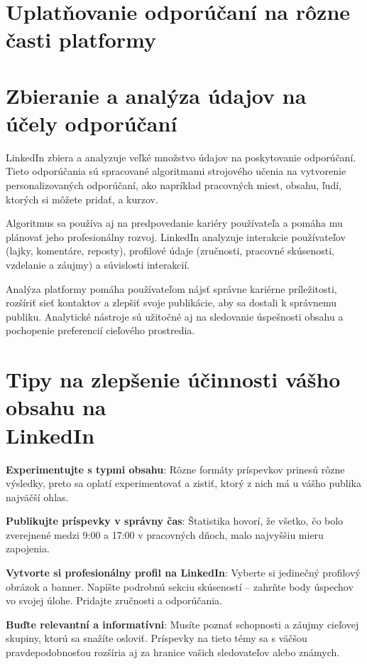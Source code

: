 \documentclass[slovak,a4paper]{coursepaper}
\begin{document}
\section{Uplatňovanie odporúčaní na rôzne časti platformy} \label{Uplatňovanie}

\section{Zbieranie a analýza údajov na účely odporúčaní} \label{analýza údajov}
LinkedIn zbiera a analyzuje veľké množstvo údajov na poskytovanie odporúčaní. Tieto odporúčania sú spracované algoritmami strojového učenia na vytvorenie personalizovaných odporúčaní, ako napríklad pracovných miest, obsahu, ľudí, ktorých si môžete pridať, a kurzov.

Algoritmus sa používa aj na predpovedanie kariéry používateľa a pomáha mu plánovať jeho profesionálny rozvoj. LinkedIn analyzuje interakcie používateľov (lajky, komentáre, reposty), profilové údaje (zručnosti, pracovné skúsenosti, vzdelanie a záujmy) a súvislosti interakcií.~\cite{Bano:article}

Analýza platformy pomáha používateľom nájsť správne kariérne príležitosti, rozšíriť sieť kontaktov a zlepšiť svoje publikácie, aby sa dostali k správnemu publiku. Analytické nástroje sú užitočné aj na sledovanie úspešnosti obsahu a pochopenie preferencií cieľového prostredia.

\section{\texorpdfstring{Tipy na zlepšenie účinnosti vášho obsahu na \\ LinkedIn}{Tipy na zlepšenie účinnosti vášho obsahu na LinkedIn}}
\label{Tipy}

\textbf{Experimentujte s typmi obsahu}: Rôzne formáty príspevkov prinesú rôzne výsledky, preto sa oplatí experimentovať a zistiť, ktorý z nich má u vášho publika najväčší ohlas.

\textbf{Publikujte príspevky v správny čas}:
Štatistika hovorí, že všetko, čo bolo zverejnené medzi 9:00 a 17:00 v pracovných dňoch, malo najvyššiu mieru zapojenia.~\cite{Newberry:article}

\textbf{Vytvorte si profesionálny profil na LinkedIn}: Vyberte si jedinečný profilový obrázok a banner. Napíšte podrobnú sekciu skúseností – zahrňte body úspechov vo svojej úlohe.
Pridajte zručnosti a odporúčania.

\textbf{Buďte relevantní a informatívni}: Musíte poznať schopnosti a záujmy cieľovej skupiny, ktorú sa snažíte osloviť. Príspevky na tieto témy sa s väčšou pravdepodobnosťou rozšíria aj za hranice vašich sledovateľov alebo známych.
\end{document}
